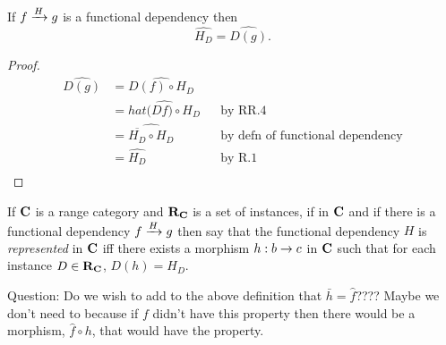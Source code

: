 \documentclass[10pt,a4paper]{article}
\theoremstyle{remark}
\renewcommand{\term}[1]{\textit{#1}}  %
\begin{document}
\begin{lemma}
\label{fdrangesublemma}
If $\fundep{H}{f}{g}$ is a functional dependency then
$$\widehat{H_D}=\widehat{D(g)}.$$
\end{lemma}
\begin{proof}
\begin{align*}
\widehat{D(g)} &= \widehat{D(f) \circ H_D} \\
               &= \widehat{hat({D{f})} \circ H_D} &&\mbox{by RR.4}\\               
               &= \widehat{\overline{H_D} \circ H_D} &&\mbox{by defn of functional dependency}\\
               &= \widehat{ H_D} &&\mbox{by R.1}\\
\end{align*}
\end{proof}

\begin{definition}
If $\catc$ is a range category and $\reqtc$ is a set of instances, if
\fgsourcediag
in $\catc$ 
and if there is a functional dependency $\fundep{H}{f}{g}$ then say that 
the functional dependency $H$ is \term{represented} in $\catc$ 
iff there exists a morphism $h:b \morph c$ in $\catc$ such that for each instance $D \in \reqtc$, $D(h)=H_D$. 
\end{definition}

\begin{oldtt}
Question: Do we wish to add to the above definition that $\bar{h}=\hat{f}$????
Maybe we don't need to because if $f$ didn't have this property then
there would be a morphism, $\hat{f}\circ h$, that would have the property.
\end{oldtt}



 

\end{document}
